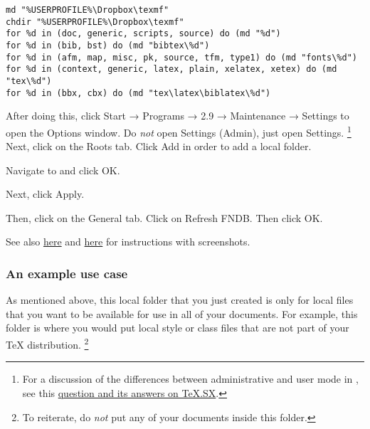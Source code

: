 \begin{listing}[htbp]
	\centering
	\begin{verbatim}
md "%USERPROFILE%\Dropbox\texmf"
chdir "%USERPROFILE%\Dropbox\texmf"
for %d in (doc, generic, scripts, source) do (md "%d")
for %d in (bib, bst) do (md "bibtex\%d")
for %d in (afm, map, misc, pk, source, tfm, type1) do (md "fonts\%d")
for %d in (context, generic, latex, plain, xelatex, xetex) do (md "tex\%d")
for %d in (bbx, cbx) do (md "tex\latex\biblatex\%d")
	\end{verbatim}
	\caption{Make a TDS-compliant directory in Dropbox for  on Windows}
	\label{lst:Windows-make-local-texmf-MiKTeX}
\end{listing}

After doing this, click Start → Programs →  2.9 → Maintenance → Settings to open the  Options window.
Do \emph{not} open Settings (Admin), just open Settings.%
\footnote{%
For a discussion of the differences between administrative and user mode in , see this \href{http://tex.stackexchange.com/q/67712/32888}{question and its answers on TeX.SX}.%
}
Next, click on the Roots tab.
Click Add in order to add a local  folder.

Navigate to  and click OK.

Next, click Apply.

Then, click on the General tab.
Click on Refresh FNDB.
Then click OK.

See also \href{http://docs.miktex.org/manual/localadditions.html#id584820}{here} and \href{http://docs.miktex.org/manual/configuring.html#fndbupdate}{here} for instructions with screenshots.

\subsubsection{An example use case}
\label{subsubsec:an-example-use-case}

As mentioned above, this local  folder that you just created is only for local files that you want to be available for use in all of your  documents.
For example, this  folder is where you would put local style or class files that are not part of your \TeX{} distribution.%
\footnote{%
To reiterate, do \emph{not} put any of your  documents inside this  folder.%
}

